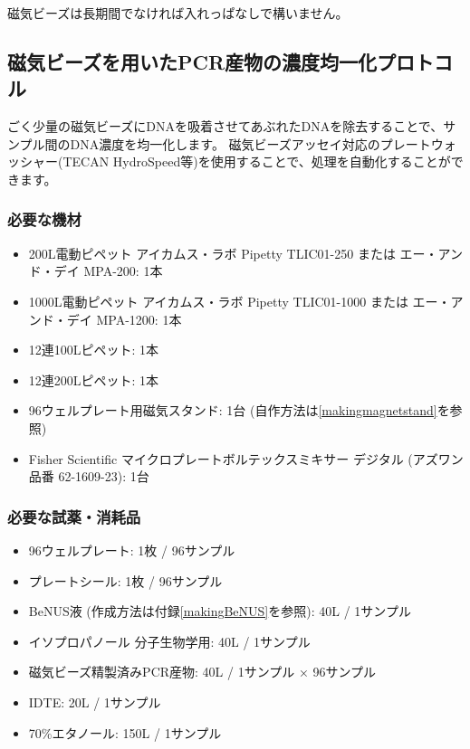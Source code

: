 \documentclass[titlepage,10pt,a4paper,uplatex]{jsbook}
\begin{document}
磁気ビーズは長期間でなければ入れっぱなしで構いません。

\subsection{磁気ビーズを用いたPCR産物の濃度均一化プロトコル}

ごく少量の磁気ビーズにDNAを吸着させてあぶれたDNAを除去することで、サンプル間のDNA濃度を均一化します。
磁気ビーズアッセイ対応のプレートウォッシャー(TECAN HydroSpeed等)を使用することで、処理を自動化することができます。

\subsubsection{必要な機材}
\begin{itemize}
\item 200{\textmu}L電動ピペット アイカムス・ラボ Pipetty TLIC01-250 または エー・アンド・デイ MPA-200: 1本
\item 1000{\textmu}L電動ピペット アイカムス・ラボ Pipetty TLIC01-1000 または エー・アンド・デイ MPA-1200: 1本
\item 12連100{\textmu}Lピペット: 1本
\item 12連200{\textmu}Lピペット: 1本
\item 96ウェルプレート用磁気スタンド: 1台 (自作方法は\ref{makingmagnetstand}を参照)
\item Fisher Scientific マイクロプレートボルテックスミキサー デジタル (アズワン品番 62-1609-23): 1台
\end{itemize}

\subsubsection{必要な試薬・消耗品}
\begin{itemize}
\item 96ウェルプレート: 1枚 / 96サンプル
\item プレートシール: 1枚 / 96サンプル
\item BeNUS液 (作成方法は付録\ref{makingBeNUS}を参照): 40{\textmu}L / 1サンプル
\item イソプロパノール 分子生物学用: 40{\textmu}L / 1サンプル
\item 磁気ビーズ精製済みPCR産物: 40{\textmu}L / 1サンプル × 96サンプル
\item IDTE: 20{\textmu}L / 1サンプル
\item 70\%エタノール: 150{\textmu}L / 1サンプル
\end{itemize}
\end{document}
